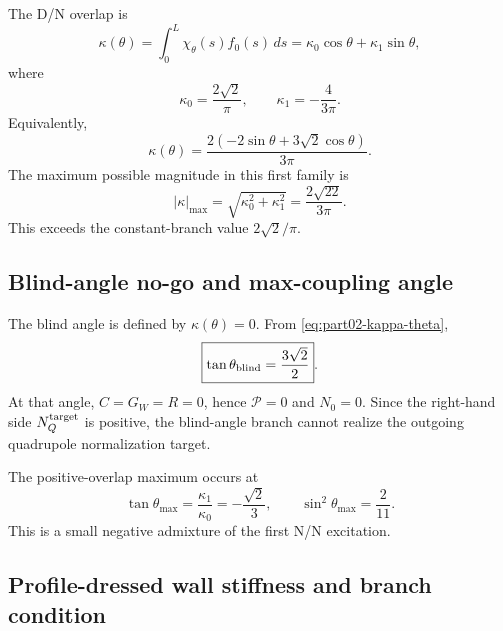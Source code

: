 The D/N overlap is
\begin{equation}
\label{eq:part02-kappa-theta}
\boxed{
\kappa(\theta)=\int_0^L\chi_\theta(s)f_0(s)\,ds
=\kappa_0\cos\theta+\kappa_1\sin\theta},
\end{equation}
where
\begin{equation}
\label{eq:part02-kappa0-kappa1}
\kappa_0=\frac{2\sqrt2}{\pi},
\qquad
\kappa_1=-\frac{4}{3\pi}.
\end{equation}
Equivalently,
\begin{equation}
\label{eq:part02-kappa-theta-explicit}
\kappa(\theta)
=
\frac{2(-2\sin\theta+3\sqrt2\cos\theta)}{3\pi}.
\end{equation}
The maximum possible magnitude in this first family is
\begin{equation}
\label{eq:part02-kappa-max}
\boxed{
|\kappa|_{\max}=\sqrt{\kappa_0^2+\kappa_1^2}=\frac{2\sqrt{22}}{3\pi}}.
\end{equation}
This exceeds the constant-branch value \(2\sqrt2/\pi\).

\subsection{Blind-angle no-go and max-coupling angle}
\label{subsec:part02-blind-max-angle}

The blind angle is defined by \(\kappa(\theta)=0\).  From \eqref{eq:part02-kappa-theta},
\begin{equation}
\label{eq:part02-blind-angle}
\boxed{
\tan\theta_{\rm blind}=\frac{3\sqrt2}{2}}.
\end{equation}
At that angle, \(C=G_W=R=0\), hence \(\mathcal P=0\) and \(N_0=0\).  Since the right-hand side \(N_Q^{\rm target}\) is positive, the blind-angle branch cannot realize the outgoing quadrupole normalization target.

The positive-overlap maximum occurs at
\begin{equation}
\label{eq:part02-theta-max}
\boxed{
\tan\theta_{\max}=\frac{\kappa_1}{\kappa_0}=-\frac{\sqrt2}{3},
\qquad
\sin^2\theta_{\max}=\frac{2}{11}}.
\end{equation}
This is a small negative admixture of the first N/N excitation.

\subsection{Profile-dressed wall stiffness and branch condition}
\label{subsec:part02-profile-dressed-stiffness}

